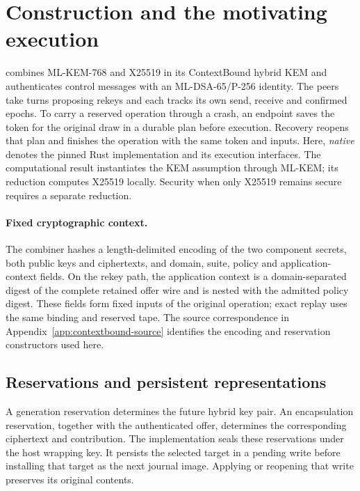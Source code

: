 \section{Construction and the motivating execution}
\label{sec:construction}

\qperiapt{} combines ML-KEM-768 and X25519 in its ContextBound hybrid
KEM and authenticates control messages with an ML-DSA-65/P-256
identity. The peers take turns proposing rekeys and each tracks its own
send, receive and confirmed epochs. To carry a reserved operation through
a crash, an endpoint saves the token for the original draw in a durable
plan before execution. Recovery reopens that plan and finishes the
operation with the same token and inputs.
Here, \emph{native} denotes the pinned Rust implementation and its
execution interfaces. The computational result instantiates the KEM
assumption through ML-KEM; its reduction computes X25519 locally.
Security when only X25519 remains secure requires a separate reduction.

\paragraph{Fixed cryptographic context.}
The combiner hashes a length-delimited encoding of the two component secrets,
both public keys and ciphertexts, and domain, suite, policy and
application-context fields. On the rekey path, the application context is a
domain-separated digest of the complete retained offer wire and is nested
with the admitted policy digest. These fields form fixed inputs of the
original operation; exact replay uses the same binding and reserved tape.
The source correspondence in Appendix~\ref{app:contextbound-source} identifies
the encoding and reservation constructors used here.

\subsection{Reservations and persistent representations}

A generation reservation determines the future hybrid key pair. An encapsulation
reservation, together with the authenticated offer, determines the corresponding
ciphertext and contribution. The implementation seals these reservations under
the host wrapping key. It persists the selected target in a pending write before
installing that target as the next journal image. Applying or reopening that
write preserves its original contents.

